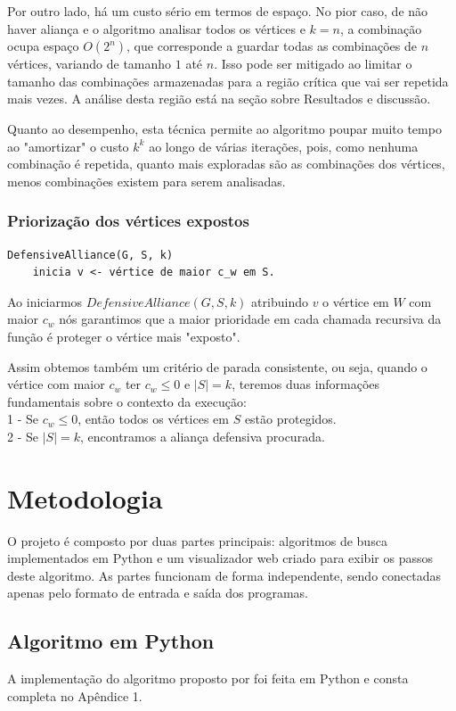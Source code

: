 Por outro lado, há um custo sério em termos de espaço. No pior caso, de não haver aliança e o algoritmo analisar todos os vértices e $k=n$, a combinação ocupa espaço $O(2^n)$, que corresponde a guardar todas as combinações de $n$ vértices, variando de tamanho $1$ até $n$. Isso pode ser mitigado ao limitar o tamanho das combinações armazenadas para a região crítica que vai ser repetida mais vezes. A análise desta região está na seção sobre Resultados e discussão.

Quanto ao desempenho, esta técnica permite ao algoritmo poupar muito tempo ao "amortizar" o custo $k^k$ ao longo de várias iterações, pois, como nenhuma combinação é repetida, quanto mais exploradas são as combinações dos vértices, menos combinações existem para serem analisadas.

\subsection{Priorização dos vértices expostos}
\begin{lstlisting}
DefensiveAlliance(G, S, k)
	inicia v <- vértice de maior c_w em S.
\end{lstlisting}

Ao iniciarmos $DefensiveAlliance(G,S,k)$ atribuindo $v$ o vértice em $W$ com maior $c_w$ nós garantimos que a maior prioridade em cada chamada recursiva da função é proteger o vértice mais "exposto".

Assim obtemos também um critério de parada consistente, ou seja, quando o vértice com maior $c_w$ ter $c_w \le 0$ e $|S| = k$, teremos duas informações fundamentais sobre o contexto da execução:\\
1 - Se $c_w \le 0$, então todos os vértices em $S$ estão protegidos.\\
2 - Se $|S|=k$, encontramos a aliança defensiva procurada.

\chapter{Metodologia}
O projeto é composto por duas partes principais: algoritmos de busca implementados em Python e um visualizador web criado para exibir os passos deste algoritmo. As partes funcionam de forma independente, sendo conectadas apenas pelo formato de entrada e saída dos programas.

\section{Algoritmo em Python}
A implementação do algoritmo proposto por \cite{Enciso2009} foi feita em Python e consta completa no Apêndice 1.

